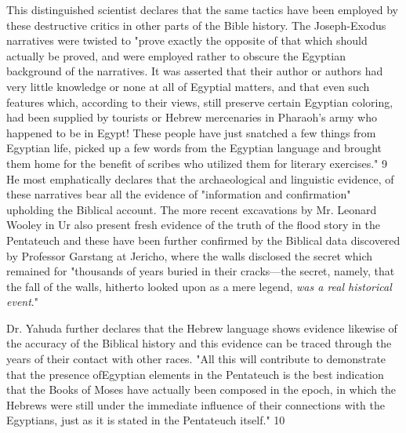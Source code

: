 This distinguished scientist declares that the same tactics have been employed by these
destructive critics in other parts of the Bible history. The Joseph-Exodus narratives were
twisted to "prove exactly the opposite of that which should actually be proved, and were
employed rather to obscure the Egyptian background of the narratives. It was asserted that
their author or authors had very little knowledge or none at all of Egyptial matters, and that
even such features which, according to their views, still preserve certain Egyptian coloring,
had been supplied by tourists or Hebrew mercenaries in Pharaoh's army who happened to be
in Egypt! These people have just snatched a few things from Egyptian life, picked up a few
words from the Egyptian language and brought them home for the benefit of scribes who
utilized them for literary exercises." 9 He most emphatically declares that the archaeological
and linguistic evidence, of these narratives bear all the evidence of "information and
confirmation" upholding the Biblical account. The more recent excavations by Mr. Leonard
Wooley in Ur also present fresh evidence of the truth of the flood story in the Pentateuch and
these have been further confirmed by the Biblical data discovered by Professor Garstang at
Jericho, where the walls disclosed the secret which remained for "thousands of years buried
in their cracks—the secret, namely, that the fall of the walls, hitherto looked upon as a mere
legend, \textit{was a real historical event}."

Dr. Yahuda further declares that the Hebrew language shows evidence likewise of the
accuracy of the Biblical history and this evidence can be traced through the years of their
contact with other races. "All this will contribute to demonstrate that the presence ofEgyptian elements in the Pentateuch is the best indication that the Books of Moses have
actually been composed in the epoch, in which the Hebrews were still under the immediate
influence of their connections with the Egyptians, just as it is stated in the Pentateuch itself."
10

